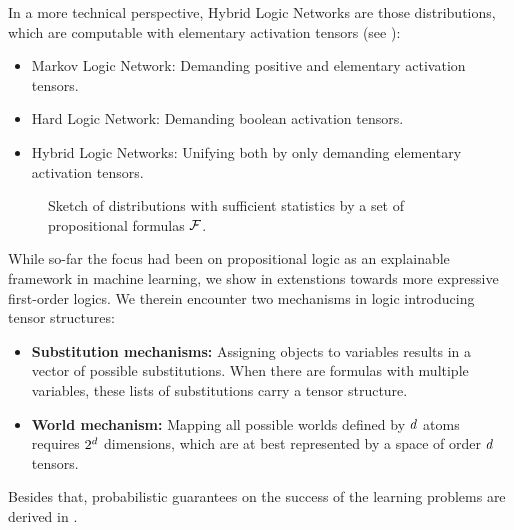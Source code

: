 In a more technical perspective, Hybrid Logic Networks are those distributions, which are computable with elementary activation tensors (see ):
\begin{itemize}
    \item Markov Logic Network: Demanding positive and elementary activation tensors.
    \item Hard Logic Network: Demanding boolean activation tensors.
    \item Hybrid Logic Networks: Unifying both by only demanding elementary activation tensors.
\end{itemize}

\begin{figure}[h]
    \begin{center}
        
    \end{center}
    \caption{Sketch of distributions with sufficient statistics by a set of propositional formulas $\mathcal{F}$.}
    \label{fig:elementaryComputableSketch}
\end{figure}





While so-far the focus had been on propositional logic as an explainable framework in machine learning, we show in  extenstions towards more expressive first-order logics.
We therein encounter two mechanisms in logic introducing tensor structures:
\begin{itemize}
    \item \textbf{Substitution mechanisms:} Assigning objects to variables results in a vector of possible substitutions. When there are formulas with multiple variables, these lists of substitutions carry a tensor structure.
    \item \textbf{World mechanism:} Mapping all possible worlds defined by $d$ atoms requires $2^{d}$ dimensions, which are at best represented by a space of order $d$ tensors.
\end{itemize}


Besides that, probabilistic guarantees on the success of the learning problems are derived in .